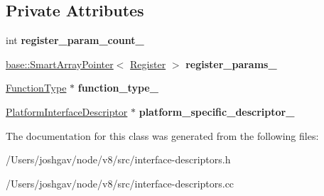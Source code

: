 \subsection*{Private Attributes}
\begin{DoxyCompactItemize}
\item 
int {\bfseries register\+\_\+param\+\_\+count\+\_\+}\hypertarget{classv8_1_1internal_1_1_call_interface_descriptor_data_aeebf3c6b4a3e01812761df1f75e5c2f0}{}\label{classv8_1_1internal_1_1_call_interface_descriptor_data_aeebf3c6b4a3e01812761df1f75e5c2f0}

\item 
\hyperlink{classv8_1_1base_1_1_smart_array_pointer}{base\+::\+Smart\+Array\+Pointer}$<$ \hyperlink{structv8_1_1internal_1_1_register}{Register} $>$ {\bfseries register\+\_\+params\+\_\+}\hypertarget{classv8_1_1internal_1_1_call_interface_descriptor_data_a1d952489b34ea5870f0137a06d470546}{}\label{classv8_1_1internal_1_1_call_interface_descriptor_data_a1d952489b34ea5870f0137a06d470546}

\item 
\hyperlink{classv8_1_1internal_1_1_function_type}{Function\+Type} $\ast$ {\bfseries function\+\_\+type\+\_\+}\hypertarget{classv8_1_1internal_1_1_call_interface_descriptor_data_a6e871e7d632358b6ef557c5a12182499}{}\label{classv8_1_1internal_1_1_call_interface_descriptor_data_a6e871e7d632358b6ef557c5a12182499}

\item 
\hyperlink{classv8_1_1internal_1_1_platform_interface_descriptor}{Platform\+Interface\+Descriptor} $\ast$ {\bfseries platform\+\_\+specific\+\_\+descriptor\+\_\+}\hypertarget{classv8_1_1internal_1_1_call_interface_descriptor_data_a8e964934aeb3b15a8e2dce5051c7a7e7}{}\label{classv8_1_1internal_1_1_call_interface_descriptor_data_a8e964934aeb3b15a8e2dce5051c7a7e7}

\end{DoxyCompactItemize}


The documentation for this class was generated from the following files\+:\begin{DoxyCompactItemize}
\item 
/\+Users/joshgav/node/v8/src/interface-\/descriptors.\+h\item 
/\+Users/joshgav/node/v8/src/interface-\/descriptors.\+cc\end{DoxyCompactItemize}
